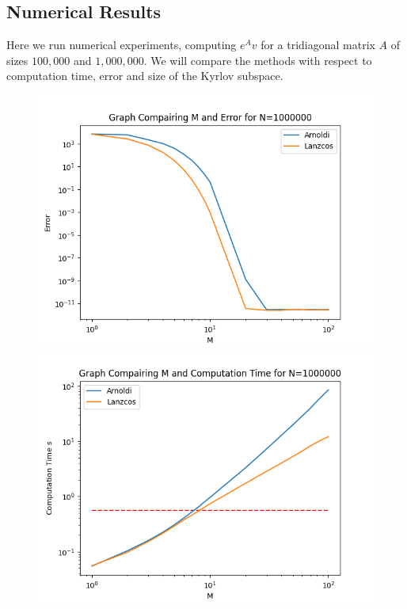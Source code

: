 \documentclass{article}
\begin{document}
\subsection{Numerical Results}
Here we run numerical experiments, computing $e^Av$ for a tridiagonal matrix $A$ of sizes $100,000$ and $1,000,000$. We will compare the methods with respect to computation time, error and size of the Kyrlov subspace.

\begin{figure}

    \centering
    \begin{minipage}{0.5\textwidth}
       \centering
	  \includegraphics[width=\linewidth]{Plots/M v E Results for N=1000000.png}
	  \label{fig:MEe7}
       \centering
	  \includegraphics[width=\linewidth]{Plots/M v Comp Time Results for N=1000000.png}

\end{minipage}
\end{figure}
\end{document}
